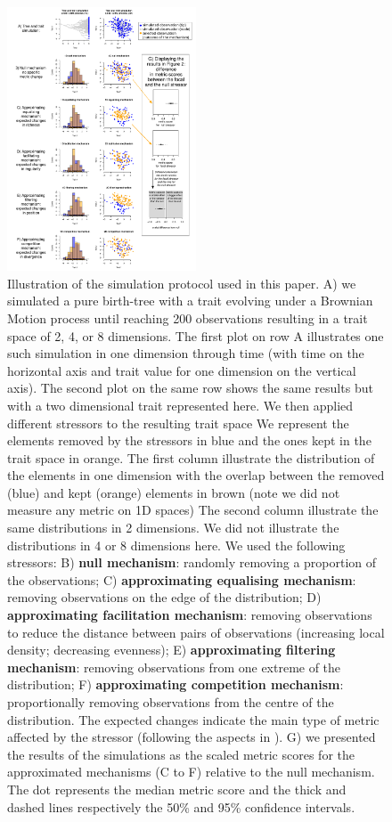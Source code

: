 \documentclass[12pt,letterpaper]{article}
\begin{document}
\begin{figure}[!htbp]
\centering
   \includegraphics[width=0.5\textwidth]{Figures/simulation_protocol_explained.pdf}
\caption{\scriptsize{Illustration of the simulation protocol used in this paper.
A) we simulated a pure birth-tree with a trait evolving under a Brownian Motion process until reaching 200 observations resulting in a trait space of 2, 4, or 8 dimensions.
The first plot on row A illustrates one such simulation in one dimension through time (with time on the horizontal axis and trait value for one dimension on the vertical axis).
The second plot on the same row shows the same results but with a two dimensional trait represented here.
We then applied different stressors to the resulting trait space
We represent the elements removed by the stressors in blue and the ones kept in the trait space in orange.
The first column illustrate the distribution of the elements in one dimension with the overlap between the removed (blue) and kept (orange) elements in brown (note we did not measure any metric on 1D spaces)
The second column illustrate the same distributions in 2 dimensions.
We did not illustrate the distributions in 4 or 8 dimensions here.
We used the following stressors:
B) \textbf{null mechanism}: randomly removing a proportion of the observations;
C) \textbf{approximating equalising mechanism}: removing observations on the edge of the distribution;
D) \textbf{approximating facilitation mechanism}: removing observations to reduce the distance between pairs of observations (increasing local density; decreasing evenness);
E) \textbf{approximating filtering mechanism}: removing observations from one extreme of the distribution;
F) \textbf{approximating competition mechanism}: proportionally removing observations from the centre of the distribution.
The expected changes indicate the main type of metric affected by the stressor (following the aspects in \citealt{mammola2021concepts}).
G) we presented the results of the simulations as the scaled metric scores for the approximated mechanisms (C to F) relative to the null mechanism. The dot represents the median metric score and the thick and dashed lines respectively the 50\% and 95\% confidence intervals.}}
\label{Fig:simulations}
\end{figure}
\bigskip
\end{document}
